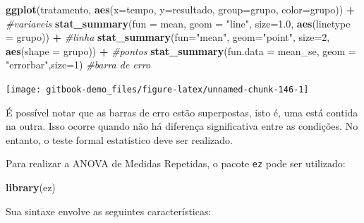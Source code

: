 \documentclass[
]{book}
\newenvironment{Shaded}{\begin{snugshade}}{\end{snugshade}}
\newcommand{\CommentTok}[1]{\textcolor[rgb]{0.56,0.35,0.01}{\textit{#1}}}
\newcommand{\DataTypeTok}[1]{\textcolor[rgb]{0.13,0.29,0.53}{#1}}
\newcommand{\DecValTok}[1]{\textcolor[rgb]{0.00,0.00,0.81}{#1}}
\newcommand{\FloatTok}[1]{\textcolor[rgb]{0.00,0.00,0.81}{#1}}
\newcommand{\KeywordTok}[1]{\textcolor[rgb]{0.13,0.29,0.53}{\textbf{#1}}}
\newcommand{\NormalTok}[1]{#1}
\newcommand{\OperatorTok}[1]{\textcolor[rgb]{0.81,0.36,0.00}{\textbf{#1}}}
\newcommand{\StringTok}[1]{\textcolor[rgb]{0.31,0.60,0.02}{#1}}
\begin{document}
\begin{Shaded}
\begin{Highlighting}[]
\KeywordTok{ggplot}\NormalTok{(tratamento, }\KeywordTok{aes}\NormalTok{(}\DataTypeTok{x=}\NormalTok{tempo, }\DataTypeTok{y=}\NormalTok{resultado, }\DataTypeTok{group=}\NormalTok{grupo, }\DataTypeTok{color=}\NormalTok{grupo)) }\OperatorTok{+}\StringTok{ }\CommentTok{#variaveis}
\StringTok{  }\KeywordTok{stat_summary}\NormalTok{(}\DataTypeTok{fun =}\NormalTok{ mean, }\DataTypeTok{geom =} \StringTok{"line"}\NormalTok{, }\DataTypeTok{size=}\FloatTok{1.0}\NormalTok{, }\KeywordTok{aes}\NormalTok{(}\DataTypeTok{linetype =}\NormalTok{ grupo)) }\OperatorTok{+}\StringTok{ }\CommentTok{#linha}
\StringTok{  }\KeywordTok{stat_summary}\NormalTok{(}\DataTypeTok{fun=}\StringTok{"mean"}\NormalTok{, }\DataTypeTok{geom=}\StringTok{"point"}\NormalTok{, }\DataTypeTok{size=}\DecValTok{2}\NormalTok{, }\KeywordTok{aes}\NormalTok{(}\DataTypeTok{shape =}\NormalTok{ grupo)) }\OperatorTok{+}\StringTok{ }\CommentTok{#pontos}
\StringTok{  }\KeywordTok{stat_summary}\NormalTok{(}\DataTypeTok{fun.data =}\NormalTok{ mean_se, }\DataTypeTok{geom =} \StringTok{"errorbar"}\NormalTok{,}\DataTypeTok{size=}\DecValTok{1}\NormalTok{) }\CommentTok{#barra de erro}
\end{Highlighting}
\end{Shaded}

\begin{center}\texttt{[image: gitbook-demo\_files/figure-latex/unnamed-chunk-146-1]} \end{center}

É possível notar que as barras de erro estão superpostas, isto é, uma está contida na outra. Isso ocorre quando não há diferença significativa entre as condições. No entanto, o teste formal estatístico deve ser realizado.

Para realizar a ANOVA de Medidas Repetidas, o pacote \texttt{ez} pode ser utilizado:

\begin{Shaded}
\begin{Highlighting}[]
\KeywordTok{library}\NormalTok{(ez)}
\end{Highlighting}
\end{Shaded}

Sua sintaxe envolve as seguintes características:
\end{document}
